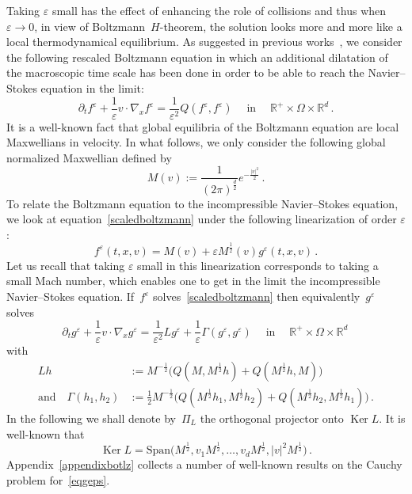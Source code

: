 \documentclass[11pt]{article}
\theoremstyle{definition}
\numberwithin{equation}{section}
\numberwithin{figure}{section}
\numberwithin{table}{section}
\newcommand*\R {\mathbb{R}}
\newcommand*\eps{{\varepsilon}}
\newcommand*\e{{\varepsilon}}
\DeclareMathOperator{\inn}{in}
\begin{document}
Taking $\eps$ small has the effect of enhancing the role of collisions and thus when~$\eps \to 0$, in view of Boltzmann~$H$-theorem, the solution looks more and more like a local thermodynamical equilibrium. As suggested in previous works~\cite{bgl1}, we consider the following rescaled Boltzmann equation in which an additional dilatation of the macroscopic time scale has been done in order to be able to reach the Navier--Stokes equation in the limit:
\begin{equation}\label{scaledboltzmann}
\partial_t f^\e + \frac1\e v \cdot \nabla_x f^\e = \frac1{\e^2} Q(f^\e,f^\e) \quad \inn \quad \R^+ \times \Omega \times {\mathbb R}^d \,.
\end{equation}
It is a well-known fact that global equilibria of the Boltzmann equation are local Maxwellians in velocity. In what follows, we only consider the following global normalized Maxwellian defined by
\[
M(v):=\frac1{(2\pi)^\frac d2} e^{-\frac{|v|^2}2} \,.
\]
To relate the Boltzmann equation to the incompressible Navier--Stokes equation, we look at equation~\eqref{scaledboltzmann} under the following linearization of order $\eps$:
\begin{equation}\label{eq:linearization}
f^\e(t,x,v)= M(v) + \e M^\frac12(v) g^\e(t,x,v)\,.
\end{equation}
Let us recall that taking $\eps$ small in this linearization corresponds to taking a small Mach number, which enables one to get in the limit the incompressible Navier--Stokes equation. If~$f^\e$ solves~\eqref{scaledboltzmann} then equivalently~$g^\e$ solves
\begin{equation}\label{eqgeps}
\partial_t g^\e + \frac1\e v \cdot\nabla_x g^\e = \frac1{\e^2} Lg^\e + \frac1\e\Gamma(g^\e,g^\e) \quad \inn \quad \R^+ \times \Omega\times {\mathbb R}^d\,
\end{equation}
with
\begin{equation}\label{defoperator}
\begin{aligned}
Lh & :=M^{-\frac12}\big(Q(M,M^\frac12 h) + Q(M^\frac12 h,M)
\big)\\
\text{and} \quad \Gamma (h_1,h_2) &:=\frac12M^{-\frac12}
\big(Q(M^\frac12 h_1,M^\frac12 h_2) + Q(M^\frac12 h_2,M^\frac12 h_1)\big)\,.
\end{aligned}
\end{equation}
In the following we shall denote by~$
\Pi_{L} $ the orthogonal projector onto $\operatorname{Ker} L$. It is well-known that
\[
\operatorname{Ker} L = \text{Span} \big(M^\frac12, v_1M^\frac12, \dots, v_dM^\frac12, |v|^2M^\frac12\big) \,.
\]
Appendix~\ref{appendixbotlz} collects a number of well-known results on the Cauchy problem for~\eqref{eqgeps}.
\end{document}
